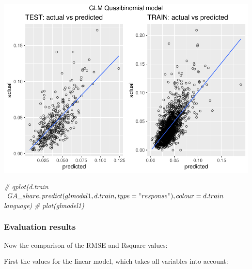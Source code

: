 \documentclass[
]{article}
\newenvironment{Shaded}{\begin{snugshade}}{\end{snugshade}}
\newcommand{\CommentTok}[1]{\textcolor[rgb]{0.56,0.35,0.01}{\textit{#1}}}
\begin{document}
\includegraphics{Lin_Mod_Clus_Anal_files/figure-latex/unnamed-chunk-23-1.pdf}

\begin{Shaded}
\begin{Highlighting}[]
\CommentTok{\# qplot(d.train$GA\_share, predict(glmodel1, d.train, type="response"), colour = d.train$language)}
\CommentTok{\# plot(glmodel1)}
\end{Highlighting}
\end{Shaded}

\hypertarget{evaluation-results}{%
\subsubsection{Evaluation results}\label{evaluation-results}}

Now the comparison of the RMSE and Rsquare values:

First the values for the linear model, which takes all variables into
account:
\end{document}
